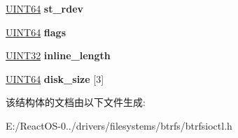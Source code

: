 \begin{DoxyCompactItemize}
\mbox{\label{structbtrfs__inode__info_a8aadce62081f98b81d6e1a25bbcba008}} 
\hyperlink{_processor_bind_8h_a57be03562867144161c1bfee95ca8f7c}{U\+I\+N\+T64} {\bfseries st\+\_\+rdev}
\item 
\mbox{\label{structbtrfs__inode__info_a60741aaa54b833593204e0680fd03485}} 
\hyperlink{_processor_bind_8h_a57be03562867144161c1bfee95ca8f7c}{U\+I\+N\+T64} {\bfseries flags}
\item 
\mbox{\label{structbtrfs__inode__info_aaca63a528262f31415ff129544b5abbb}} 
\hyperlink{_processor_bind_8h_ae1e6edbbc26d6fbc71a90190d0266018}{U\+I\+N\+T32} {\bfseries inline\+\_\+length}
\item 
\mbox{\label{structbtrfs__inode__info_ab7ef8018526346f177f01170c90a5383}} 
\hyperlink{_processor_bind_8h_a57be03562867144161c1bfee95ca8f7c}{U\+I\+N\+T64} {\bfseries disk\+\_\+size} \mbox{[}3\mbox{]}
\end{DoxyCompactItemize}


该结构体的文档由以下文件生成\+:\begin{DoxyCompactItemize}
\item 
E\+:/\+React\+O\+S-\/0../drivers/filesystems/btrfs/btrfsioctl.\+h\end{DoxyCompactItemize}
